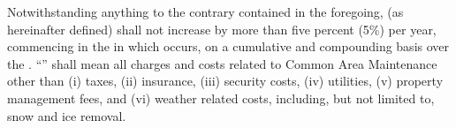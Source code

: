 Notwithstanding anything to the contrary contained in the foregoing,  (as hereinafter defined) shall not increase by more than five percent (5\%) per year, commencing in the \leaseYear in which \rentCommencementDate occurs, on a cumulative and compounding basis over the \termOfLease. ``\controllableCAM'' shall mean all charges and costs related to Common Area Maintenance other than (i) taxes, (ii) insurance, (iii) security costs, (iv) utilities, (v) property management fees, and (vi) weather related costs, including, but not limited to, snow and ice removal.
